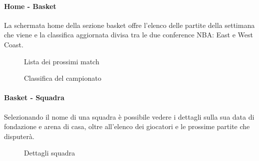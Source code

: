     \paragraph{Home - Basket} La schermata home della sezione basket offre l'elenco delle partite della settimana che viene e la classifica aggiornata divisa tra le due conference NBA: East e West Coast. 
    \begin{figure}[H]
        \centering
        \caption{Lista dei prossimi match}
        \label{fig:enter-label}
    \end{figure}
    \begin{figure}[H]
        \centering
        \caption{Classifica del campionato}
        \label{fig:enter-label}
    \end{figure}
    
    \paragraph{Basket - Squadra} Selezionando il nome di una squadra è possibile vedere i dettagli sulla sua data di fondazione e arena di casa, oltre all'elenco dei giocatori e le prossime partite che disputerà.
    \begin{figure}[H]
        \centering
        \caption{Dettagli squadra}
        \label{fig:enter-label}
    \end{figure}
    
